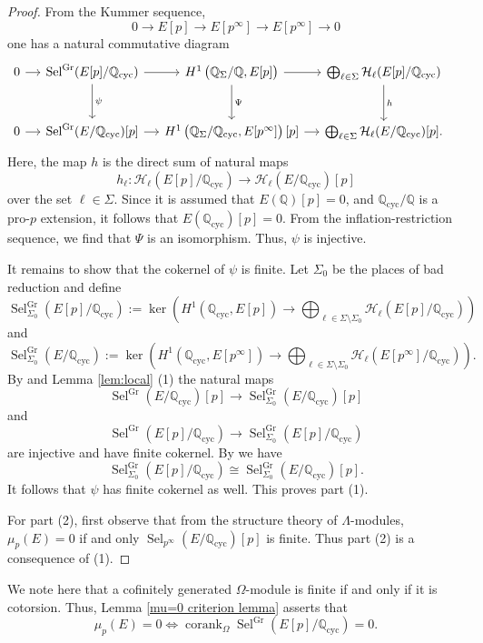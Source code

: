 \documentclass[12pt]{amsart}
\newcommand{\cH}{\mathcal{H}}
\newcommand{\Q}{\mathbb{Q}}
\newcommand{\cyc}{\mathrm{cyc}}
\newcommand{\op}[1]{\operatorname{#1}}
\numberwithin{equation}{section}
\begin{document}
\begin{proof}
   From the Kummer sequence,
   \[0\to E[p]\to E[p^\infty]\to E[p^\infty]\to 0\] 
   one has a natural commutative diagram
   \begin{equation}\label{commutative diagram selmer}
\begin{tikzcd}[column sep = small, row sep = large]
0\arrow{r} & \op{Sel}^{\op{Gr}}(E[p]/\Q_{\op{cyc}})\arrow{r} \arrow{d}{\psi} & H^1\left(\Q_\Sigma/\Q,E[p]\right) \arrow{r} \arrow{d}{\Psi} & \bigoplus_{\ell\in \Sigma} \cH_\ell(E[p]/\Q_{\op{cyc}}) \arrow{d}{h} &\\
0\arrow{r} & \op{Sel}^{\op{Gr}}(E/\Q_{\op{cyc}})[p] \arrow{r} & H^1\left(\Q_\Sigma/\Q_{\op{cyc}},E[p^\infty]\right)[p] \arrow{r} &\bigoplus_{\ell\in \Sigma} \cH_\ell(E/\Q_{\op{cyc}})[p].
\end{tikzcd}\end{equation}
    Here, the map $h$ is the direct sum of natural maps
    \[h_\ell:\cH_\ell(E[p]/\Q_{\op{cyc}})\rightarrow  \cH_\ell(E/\Q_{\op{cyc}})[p] \]
    over the set $\ell\in \Sigma$. Since it is assumed that $E(\Q)[p]=0$, and $\Q_{\op{cyc}}/\Q$ is a pro-$p$ extension, it follows that $E(\Q_{\op{cyc}})[p]=0$. From the inflation-restriction sequence, we find that $\Psi$ is an isomorphism. Thus, $\psi$ is injective.
   
 \par It remains to show that the cokernel of $\psi$ is finite. Let $\Sigma_0$ be the places of bad reduction and define
    \[\op{Sel}_{\Sigma_0}^{\op{Gr}}(E[p]/\Q_{\op{cyc}}):=\op{ker}\left(H^1(\Q_{\op{cyc}}, E[p])\longrightarrow \bigoplus_{\ell\in \Sigma\setminus \Sigma_0} \cH_\ell(E[p]/\Q_{\op{cyc}})\right)\]
    and
    \[\op{Sel}_{\Sigma_0}^{\op{Gr}}(E/\Q_{\op{cyc}}):=\op{ker}\left(H^1(\Q_{\op{cyc}}, E[p^\infty])\longrightarrow \bigoplus_{\ell\in \Sigma\setminus \Sigma_0} \cH_\ell(E[p^\infty]/\Q_{\op{cyc}})\right).\] By \cite[Proposition 2.4]{greenberg-vatsal} and Lemma \ref{lem:local} (1) the natural maps
    \[\op{Sel}^{\op{Gr}}(E/\Q_{\op{cyc}})[p] \to \op{Sel}_{\Sigma_0}^{\op{Gr}}(E/\Q_{\op{\cyc}})[p]\] and
     \[\op{Sel}^{\op{Gr}}(E[p]/\Q_{\op{cyc}}) \to \op{Sel}_{\Sigma_0}^{\op{Gr}}(E[p]/\Q_{\op{\cyc}})\]
     are injective and have finite cokernel. By \cite[Proposition 2.8]{greenberg-vatsal} we have 
     \[\op{Sel}_{\Sigma_0}^{\op{Gr}}(E[p]/\Q_{\op{cyc}})\cong \op{Sel}^{\op{Gr}}_{\Sigma_0}(E/\Q_{\op{cyc}})[p]. \]
     It follows that $\psi$ has finite cokernel as well. This proves part (1). 

     \par For part (2), first observe that from the structure theory of $\Lambda$-modules, $\mu_p(E)=0$ if and only $\op{Sel}_{p^\infty}(E/\Q_{\op{cyc}})[p]$ is finite. Thus part (2) is a consequence of (1).
\end{proof}
We note here that a cofinitely generated $\Omega$-module is finite if and only if it is cotorsion. Thus, Lemma \ref{mu=0 criterion lemma} asserts that 
\[\mu_p(E)=0\Leftrightarrow \op{corank}_{\Omega}\op{Sel}^{\op{Gr}}(E[p]/\Q_{\op{cyc}})=0.\]
\end{document}
